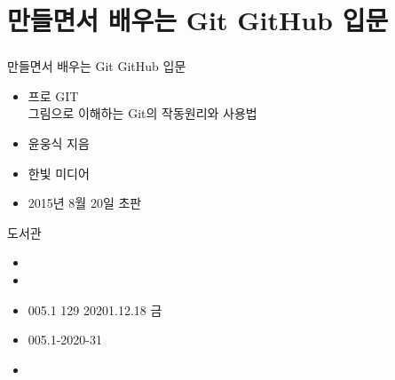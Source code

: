 \documentclass[aspectratio=1610,17pt,xcolor=pdftex,dvipsnames,table,handout]{beamer}
\begin{document}
		\section{만들면서 배우는 Git GitHub 입문}
		\begin{frame} [t,plain]
		\frametitle{}
			\begin{block}  {만들면서 배우는 Git GitHub 입문}
			\setlength{\leftmargini}{4em}			
			\begin{itemize} 
				\item [제목]  	프로 GIT 	\\	그림으로 이해하는 Git의 작동원리와 사용법 
				\item [지은이]	윤웅식 지음
				\item [출판사]	한빛 미디어
				\item [출판일]	2015년 8월 20일  초판 
			\end{itemize}
			\end{block}						

			\begin{block}  {도서관}
			\setlength{\leftmargini}{4em}			
			\begin{itemize}
				\item [중앙]		
				\item [수정]		
				\item [부전]		005.1 129	20201.12.18 금
				\item [부산]		005.1-2020-31
				\item [도서관]
			\end{itemize}
			\end{block}						
								
		\end{frame}						


\end{document}

